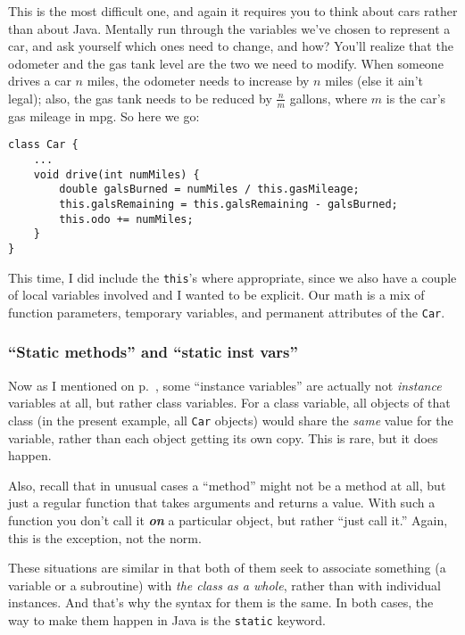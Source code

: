 This is the most difficult one, and again it requires you to think about cars
rather than about Java. Mentally run through the variables we've chosen to
represent a car, and ask yourself which ones need to change, and how? You'll
realize that the odometer and the gas tank level are the two we need to
modify. When someone drives a car $n$ miles, the odometer needs to increase by
$n$ miles (else it ain't legal); also, the gas tank needs to be reduced by
$\frac{n}{m}$ gallons, where $m$ is the car's gas mileage in mpg. So here we
go:

\begin{Verbatim}[samepage=true,fontsize=\footnotesize,frame=single]
class Car {
    ...
    void drive(int numMiles) {
        double galsBurned = numMiles / this.gasMileage;
        this.galsRemaining = this.galsRemaining - galsBurned;
        this.odo += numMiles;
    }
}
\end{Verbatim}

This time, I did include the \texttt{this}'s where appropriate, since we also
have a couple of local variables involved and I wanted to be explicit. Our
math is a mix of function parameters, temporary variables, and permanent
attributes of the \texttt{Car}.

\subsubsection{``Static methods'' and ``static inst vars''}

Now as I mentioned on p.~\pageref{mentionStatic}, some ``instance variables''
are actually not \textit{instance} variables at all, but rather class
variables. For a class variable, all objects of that class (in the present
example, all \texttt{Car} objects) would share the \textit{same} value for the
variable, rather than each object getting its own copy. This is rare, but it
does happen.

Also, recall that in unusual cases a ``method'' might not be a method at all,
but just a regular function that takes arguments and returns a value. With such
a function you don't call it \textbf{\textit{on}} a particular object, but
rather ``just call it.'' Again, this is the exception, not the norm.

These situations are similar in that both of them seek to associate something
(a variable or a subroutine) with \textit{the class as a whole}, rather than
with individual instances. And that's why the syntax for them is the same. In
both cases, the way to make them happen in Java is the \texttt{static} keyword.

